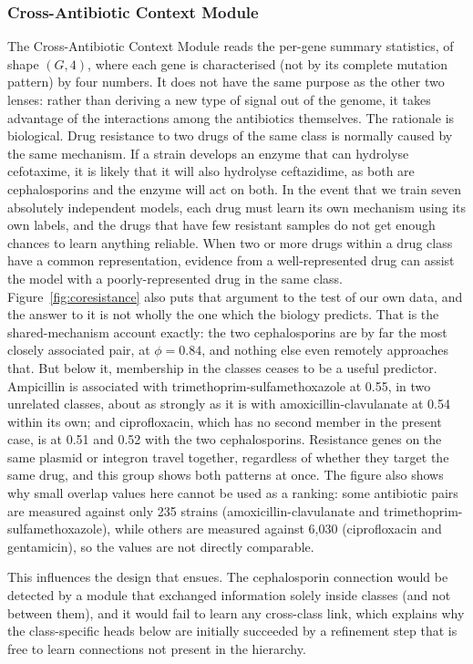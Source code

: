 \subsubsection{Cross-Antibiotic Context Module}

The Cross-Antibiotic Context Module reads the per-gene summary statistics, of shape $(G, 4)$,
where each gene is characterised (not by its complete mutation pattern) by four numbers. It
does not have the same purpose as the other two lenses: rather than deriving a new type of
signal out of the genome, it takes advantage of the interactions among the antibiotics
themselves. The rationale is biological. Drug resistance to two drugs of the same class is
normally caused by the same mechanism. If a strain develops an enzyme that can hydrolyse cefotaxime, it is likely that it will also
hydrolyse ceftazidime, as both are cephalosporins and the enzyme will act on both. In the event that we train seven absolutely independent
models, each drug must learn its own mechanism using its own labels, and the drugs that have
few resistant samples do not get enough chances to learn anything reliable. When two or more drugs within a drug class have a common representation, evidence from a
well-represented drug can assist the model with a poorly-represented drug in the same class. Figure~\ref{fig:coresistance} also puts that
argument to the test of our own data, and the answer to it is not wholly the one which the
biology predicts. That is the shared-mechanism account exactly: the two cephalosporins are by
far the most closely associated pair, at $\phi = 0.84$, and nothing else even remotely
approaches that. But below it, membership in the classes ceases to be a useful predictor.
Ampicillin is associated with trimethoprim-sulfamethoxazole at 0.55, in two unrelated classes,
about as strongly as it is with amoxicillin-clavulanate at 0.54 within its own; and ciprofloxacin,
which has no second member in the present case, is at 0.51 and 0.52 with the two
cephalosporins. Resistance genes on the same plasmid or integron travel together, regardless of whether they
target the same drug, and this group shows both patterns at once. The figure also shows why
small overlap values here cannot be used as a ranking: some antibiotic pairs are measured
against only 235 strains (amoxicillin-clavulanate and trimethoprim-sulfamethoxazole), while
others are measured against 6{,}030 (ciprofloxacin and gentamicin), so the values are not
directly comparable.

This influences the design that ensues. The cephalosporin connection would be detected by a
module that exchanged information solely inside classes (and not between them), and it would
fail to learn any cross-class link, which explains why the class-specific heads below are
initially succeeded by a refinement step that is free to learn connections not present in the
hierarchy.

